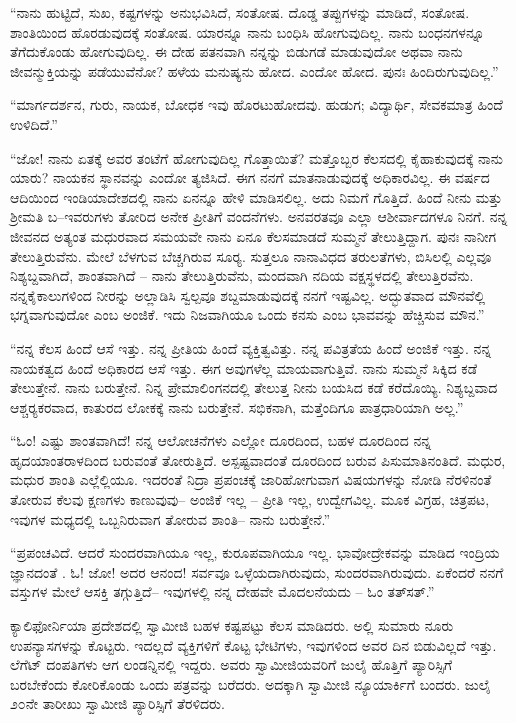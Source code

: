  “ನಾನು ಹುಟ್ಟಿದೆ, ಸುಖ, ಕಷ್ಟಗಳನ್ನು ಅನುಭವಿಸಿದೆ, ಸಂತೋಷ. ದೊಡ್ಡ ತಪ್ಪುಗಳನ್ನು ಮಾಡಿದೆ, ಸಂತೋಷ. ಶಾಂತಿಯಿಂದ ಹೊರಡುವುದಕ್ಕೆ ಸಂತೋಷ. ಯಾರನ್ನೂ ನಾನು ಬಂಧಿಸಿ ಹೋಗುವುದಿಲ್ಲ. ನಾನು ಬಂಧನಗಳನ್ನೂ ತೆಗೆದುಕೊಂಡು ಹೋಗುವುದಿಲ್ಲ. ಈ ದೇಹ ಪತನವಾಗಿ ನನ್ನನ್ನು ಬಿಡುಗಡೆ ಮಾಡುವುದೋ ಅಥವಾ ನಾನು ಜೀವನ್ಮುಕ್ತಿಯನ್ನು ಪಡೆಯುವೆನೋ? ಹಳೆಯ ಮನುಷ್ಯನು ಹೋದ. ಎಂದೋ ಹೋದ. ಪುನಃ ಹಿಂದಿರುಗುವುದಿಲ್ಲ.” 

 “ಮಾರ್ಗದರ್ಶನ, ಗುರು, ನಾಯಕ, ಬೋಧಕ ಇವು ಹೊರಟುಹೋದವು. ಹುಡುಗ; ವಿದ್ಯಾರ್ಥಿ, ಸೇವಕಮಾತ್ರ ಹಿಂದೆ ಉಳಿದಿದೆ.” 

 “ಜೋ! ನಾನು ಏತಕ್ಕೆ ಅವರ ತಂಟೆಗೆ ಹೋಗುವುದಿಲ್ಲ ಗೊತ್ತಾಯಿತೆ? ಮತ್ತೊಬ್ಬರ ಕೆಲಸದಲ್ಲಿ ಕೈಹಾಕುವುದಕ್ಕೆ ನಾನು ಯಾರು? ನಾಯಕನ ಸ್ಥಾನವನ್ನು ಎಂದೋ ತ್ಯಜಿಸಿದೆ. ಈಗ ನನಗೆ ಮಾತನಾಡುವುದಕ್ಕೆ ಅಧಿಕಾರವಿಲ್ಲ. ಈ ವರ್ಷದ ಆದಿಯಿಂದ ಇಂಡಿಯಾದೇಶದಲ್ಲಿ ನಾನು ಏನನ್ನೂ ಹೇಳಿ ಮಾಡಿಸಲಿಲ್ಲ. ಅದು ನಿಮಗೆ ಗೊತ್ತಿದೆ. ಹಿಂದೆ ನೀನು ಮತ್ತು ಶ‍್ರೀಮತಿ ಬ–ಇವರುಗಳು ತೋರಿದ ಅನೇಕ ಪ್ರೀತಿಗೆ ವಂದನೆಗಳು. ಅನವರತವೂ ಎಲ್ಲಾ ಆಶೀರ್ವಾದಗಳೂ ನಿನಗೆ. ನನ್ನ ಜೀವನದ ಅತ್ಯಂತ ಮಧುರವಾದ ಸಮಯವೇ ನಾನು ಏನೂ ಕೆಲಸಮಾಡದೆ ಸುಮ್ಮನೆ ತೇಲುತ್ತಿದ್ದಾಗ. ಪುನಃ ನಾನೀಗ ತೇಲುತ್ತಿರುವೆನು. ಮೇಲೆ ಬೆಳಗುವ ಬೆಚ್ಚಗಿರುವ ಸೂರ‍್ಯ. ಸುತ್ತಲೂ ನಾನಾವಿಧದ ತರುಲತೆಗಳು, ಬಿಸಿಲಲ್ಲಿ ಎಲ್ಲವೂ ನಿಶ್ಯಬ್ದವಾಗಿದೆ, ಶಾಂತವಾಗಿದೆ – ನಾನು ತೇಲುತ್ತಿರುವೆನು, ಮಂದವಾಗಿ ನದಿಯ ವಕ್ಷಸ್ಥಳದಲ್ಲಿ ತೇಲುತ್ತಿರವೆನು. ನನ್ನ\break ಕೈಕಾಲುಗಳಿಂದ ನೀರನ್ನು ಅಲ್ಲಾಡಿಸಿ ಸ್ವಲ್ಪವೂ ಶಬ್ದಮಾಡುವುದಕ್ಕೆ ನನಗೆ ಇಷ್ಟವಿಲ್ಲ. ಅದ್ಭುತವಾದ ಮೌನವೆಲ್ಲಿ ಭಗ್ನವಾಗುವುದೋ ಎಂಬ ಅಂಜಿಕೆ. ಇದು ನಿಜವಾಗಿಯೂ ಒಂದು ಕನಸು ಎಂಬ ಭಾವವನ್ನು ಹೆಚ್ಚಿಸುವ ಮೌನ.” 

 “ನನ್ನ ಕೆಲಸ ಹಿಂದೆ ಆಸೆ ಇತ್ತು. ನನ್ನ ಪ್ರೀತಿಯ ಹಿಂದೆ ವ್ಯಕ್ತಿತ್ವವಿತ್ತು. ನನ್ನ ಪವಿತ್ರತೆಯ ಹಿಂದೆ ಅಂಜಿಕೆ ಇತ್ತು. ನನ್ನ ನಾಯಕತ್ವದ ಹಿಂದೆ ಅಧಿಕಾರದ ಆಸೆ ಇತ್ತು. ಈಗ ಅವುಗಳೆಲ್ಲ ಮಾಯವಾಗುತ್ತಿವೆ. ನಾನು ಸುಮ್ಮನೆ ಸಿಕ್ಕಿದ ಕಡೆ ತೇಲುತ್ತೇನೆ. ನಾನು ಬರುತ್ತೇನೆ. ನಿನ್ನ ಪ್ರೇಮಾಲಿಂಗನದಲ್ಲಿ ತೇಲುತ್ತ ನೀನು ಬಯಸಿದ ಕಡೆ ಕರೆದೊಯ್ಯಿ. ನಿಶ್ಯಬ್ದವಾದ ಆಶ್ಚರ‍್ಯಕರವಾದ, ಕಾತುರದ ಲೋಕಕ್ಕೆ ನಾನು ಬರುತ್ತೇನೆ. ಸಭಿಕನಾಗಿ, ಮತ್ತೆಂದಿಗೂ ಪಾತ್ರಧಾರಿಯಾಗಿ ಅಲ್ಲ.” 

 “ಓಂ! ಎಷ್ಟು ಶಾಂತವಾಗಿದೆ! ನನ್ನ ಆಲೋಚನೆಗಳು ಎಲ್ಲೋ ದೂರದಿಂದ, ಬಹಳ ದೂರದಿಂದ ನನ್ನ ಹೃದಯಾಂತರಾಳದಿಂದ ಬರುವಂತೆ ತೋರುತ್ತಿದೆ. ಅಸ್ಪಷ್ಟವಾದಂತೆ ದೂರದಿಂದ ಬರುವ ಪಿಸುಮಾತಿನಂತಿದೆ. ಮಧುರ, ಮಧುರ ಶಾಂತಿ ಎಲ್ಲೆಲ್ಲಿಯೂ. ಇದರಂತೆ ನಿದ್ರಾ ಪ್ರಪಂಚಕ್ಕೆ ಜಾರಿಹೋಗುವಾಗ ವಿಷಯಗಳನ್ನು ನೋಡಿ ನೆರಳಿನಂತೆ ತೋರುವ ಕೆಲವು ಕ್ಷಣಗಳು ಕಾಣುವುವು– ಅಂಜಿಕೆ ಇಲ್ಲ – ಪ್ರೀತಿ ಇಲ್ಲ, ಉದ್ವೇಗವಿಲ್ಲ. ಮೂಕ ವಿಗ್ರಹ, ಚಿತ್ರಪಟ, ಇವುಗಳ ಮಧ್ಯದಲ್ಲಿ ಒಬ್ಬನಿರುವಾಗ ತೋರುವ ಶಾಂತಿ– ನಾನು ಬರುತ್ತೇನೆ.” 

 “ಪ್ರಪಂಚವಿದೆ. ಆದರೆ ಸುಂದರವಾಗಿಯೂ ಇಲ್ಲ, ಕುರೂಪವಾಗಿಯೂ ಇಲ್ಲ. ಭಾವೋದ್ರೇಕವನ್ನು ಮಾಡಿದ ಇಂದ್ರಿಯ ಜ್ಞಾನದಂತೆ . ಓ! ಜೋ! ಅದರ ಆನಂದ! ಸರ್ವವೂ ಒಳ್ಳೆಯದಾಗಿರುವುದು, ಸುಂದರವಾಗಿರುವುದು. ಏಕೆಂದರೆ ನನಗೆ ವಸ್ತುಗಳ ಮೇಲೆ ಆಸಕ್ತಿ ತಗ್ಗುತ್ತಿದೆ– ಇವುಗಳಲ್ಲಿ ನನ್ನ ದೇಹವೇ ಮೊದಲನೆಯದು – ಓಂ ತತ್‍ಸತ್.” 

 ಕ್ಯಾಲಿಫೋರ್ನಿಯಾ ಪ್ರದೇಶದಲ್ಲಿ ಸ್ವಾಮೀಜಿ ಬಹಳ ಕಷ್ಟಪಟ್ಟು ಕೆಲಸ ಮಾಡಿದರು. ಅಲ್ಲಿ ಸುಮಾರು ನೂರು ಉಪನ್ಯಾಸಗಳನ್ನು ಕೊಟ್ಟರು. ಇದಲ್ಲದೆ ವ್ಯಕ್ತಿಗಳಿಗೆ ಕೊಟ್ಟ ಭೇಟಿಗಳು, ಇವುಗಳಿಂದ ಅವರ ದಿನ ಬಿಡುವಿಲ್ಲದೆ ಇತ್ತು. ಲೆಗೆಟ್ ದಂಪತಿಗಳು ಆಗ ಲಂಡನ್ನಿನಲ್ಲಿ ಇದ್ದರು. ಅವರು ಸ್ವಾಮೀಜಿಯವರಿಗೆ ಜುಲೈ ಹೊತ್ತಿಗೆ ಪ್ಯಾರಿಸ್ಸಿಗೆ ಬರಬೇಕೆಂದು ಕೋರಿಕೊಂಡು ಒಂದು ಪತ್ರವನ್ನು ಬರೆದರು. ಅದಕ್ಕಾಗಿ ಸ್ವಾಮೀಜಿ ನ್ಯೂಯಾರ್ಕಿಗೆ ಬಂದರು. ಜುಲೈ ೨೦ನೇ ತಾರೀಖು ಸ್ವಾಮೀಜಿ ಪ್ಯಾರಿಸ್ಸಿಗೆ ತೆರಳಿದರು. 

